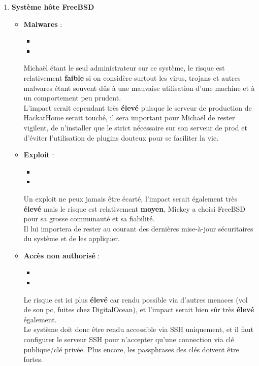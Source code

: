 \documentclass[a4paper,10pt,final,fleqn]{article}
\begin{document}
\begin{enumerate}
					\item \textbf{Système hôte FreeBSD}

						\begin{itemize}
							\item \textbf{Malwares} : \\

								\begin{itemize}
									\item 
									\item 
								\end{itemize}

								Michaël étant le seul administrateur sur ce système, le risque est relativement \textbf{faible} si on considère surtout les virus, trojans et autres malwares étant souvent dûs à une mauvaise utilisation d'une machine et à un comportement peu prudent.\\
							L'impact serait cependant très \textbf{élevé} puisque le serveur de production de HackatHome serait touché, il sera important pour Michaël de rester vigilent, de n'installer que le strict nécessaire sur son serveur de prod et d'éviter l'utilisation de plugins douteux pour se faciliter la vie.\\
							\item \textbf{Exploit} : \\

								\begin{itemize}
									\item 
									\item 
								\end{itemize}

							Un exploit ne peux jamais être écarté, l'impact serait également très \textbf{élevé} mais le risque est relativement \textbf{moyen}, Mickey a choisi FreeBSD pour sa grosse communauté et sa fiabilité.\\
							Il lui importera de rester au courant des dernières mise-à-jour sécuritaires du système et de les appliquer.\\
							\item \textbf{Accès non authorisé } : \\

								\begin{itemize}
									\item 
									\item 
								\end{itemize}

							Le risque est ici plus \textbf{élevé} car rendu possible via d'autres menaces (vol de son pc, fuites chez DigitalOcean), et l'impact serait bien sûr très \textbf{élevé} également.\\
							Le système doit donc être rendu accessible via SSH uniquement, et il faut configurer le serveur SSH pour n'accepter qu'une connection via clé publique/clé privée. Plus encore, les passphrases des clés doivent être fortes.\\



\end{itemize}
\end{enumerate}
\end{document}
